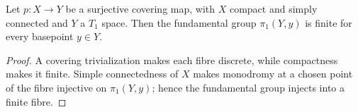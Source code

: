 \begin{lemma}
  \label{lem:dc-ch9-3-2-compact-cover}
  \leanok
  Let $p:X\to Y$ be a surjective covering map, with $X$ compact and simply connected and
  $Y$ a $T_1$ space.  Then the fundamental group $\pi_1(Y,y)$ is finite for every basepoint
  $y\in Y$.
\end{lemma}
\begin{proof}
  \leanok
  A covering trivialization makes each fibre discrete, while compactness makes it finite.
  Simple connectedness of $X$ makes monodromy at a chosen point of the fibre injective on
  $\pi_1(Y,y)$; hence the fundamental group injects into a finite fibre.
\end{proof}

